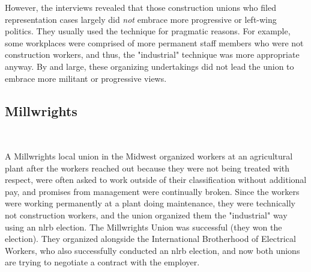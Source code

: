 \documentclass[12pt]{article}
\begin{document}

However, the interviews revealed that those construction unions who filed representation cases largely did \emph{not} embrace more progressive or left-wing politics. They usually used the technique for pragmatic reasons. For example, some workplaces were comprised of more permanent staff members who were not construction workers, and thus, the "industrial" technique was more appropriate anyway. By and large, these organizing undertakings did not lead the union to embrace more militant or progressive views.

\subsection{Millwrights}\

A Millwrights local union in the Midwest organized workers at an agricultural plant after the workers reached out because they were not being treated with respect, were often asked to work outside of their classification without additional pay, and promises from management were continually broken. Since the workers were working permanently at a plant doing maintenance, they were technically not construction workers, and the union organized them the "industrial" way using an \acrshort{nlrb} election. The Millwrights Union was successful (they won the election). They organized alongside the International Brotherhood of Electrical Workers, who also successfully conducted an \acrshort{nlrb} election, and now both unions are trying to negotiate a contract with the employer.
\end{document}
